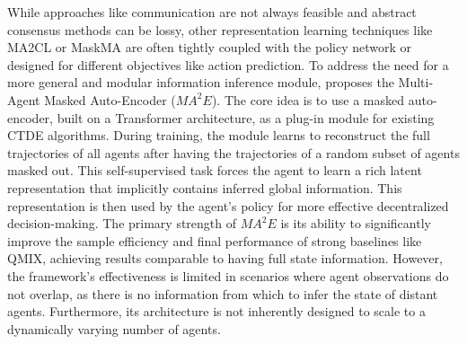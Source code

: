 While approaches like communication are not always feasible and abstract consensus methods can be lossy, other representation learning techniques like MA2CL or MaskMA are often tightly coupled with the policy network or designed for different objectives like action prediction. To address the need for a more general and modular information inference module,
\parencite{ma2e} proposes the Multi-Agent Masked Auto-Encoder (${MA}^2E$). The core idea is to use a masked auto-encoder, built on a Transformer architecture, as a plug-in module for existing CTDE algorithms. During training, the module learns to reconstruct the full trajectories of all agents after having the trajectories of a random subset of agents masked out. This self-supervised task forces the agent to learn a rich latent representation that implicitly contains inferred global information. This representation is then used by the agent's policy for more effective decentralized decision-making. 
The primary strength of ${MA}^2E$ is its ability to significantly improve the sample efficiency and final performance of strong baselines like QMIX, achieving results comparable to having full state information. However, the framework's effectiveness is limited in scenarios where agent observations do not overlap, as there is no information from which to infer the state of distant agents. Furthermore, its architecture is not inherently designed to scale to a dynamically varying number of agents.




